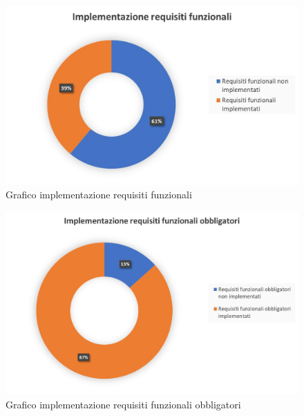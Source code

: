         \begin{figure}[H]
            \includegraphics[width=\textwidth,height=\textheight,keepaspectratio]{./img/Grafici/implementazione_requisiti_funzionali.jpg}
            \caption{Grafico implementazione requisiti funzionali}
        \end{figure}
        \begin{figure}[H]
            \includegraphics[width=\textwidth,height=\textheight,keepaspectratio]{./img/Grafici/implementazione_requisiti_funzionali_obbligatori.jpg}
            \caption{Grafico implementazione requisiti funzionali obbligatori}
        \end{figure}
